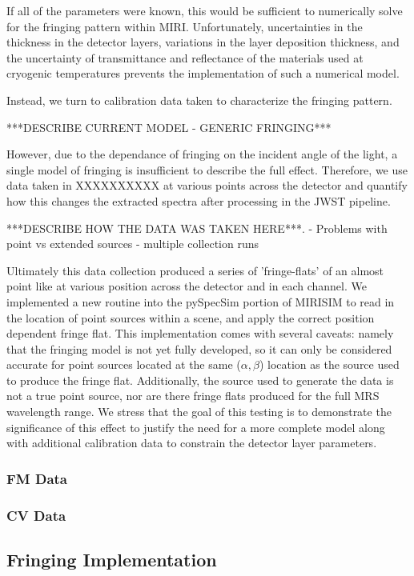 If all of the parameters were known, this would be sufficient to numerically solve for the fringing pattern within MIRI. 
Unfortunately, uncertainties in the thickness in the detector layers, variations in the layer deposition thickness, and the uncertainty of transmittance and reflectance of the materials used at cryogenic temperatures prevents the implementation of such a numerical model.

Instead, we turn to calibration data taken to characterize the fringing pattern.

 ***DESCRIBE CURRENT MODEL - GENERIC FRINGING***
 
However, due to the dependance of fringing on the incident angle of the light, a single model of fringing is insufficient to describe the full effect. 
Therefore, we use data taken in XXXXXXXXXX at various points across the detector and quantify how this changes the extracted spectra after processing in the JWST pipeline.

 ***DESCRIBE HOW THE DATA WAS TAKEN HERE***.
 - Problems with point vs extended sources
 - multiple collection runs


Ultimately this data collection produced a series of 'fringe-flats' of an almost point like at various position across the detector and in each channel.
We implemented a new routine into the pySpecSim portion of MIRISIM to read in the location of point sources within a scene, and apply the correct position dependent fringe flat. 
This implementation comes with several caveats: namely that the fringing model is not yet fully developed, so it can only be considered accurate for point sources located at the same ($\alpha,\beta$) location as the source used to produce the fringe flat. Additionally, the source used to generate the data is not a true point source, nor are there fringe flats produced for the full MRS wavelength range.
We stress that the goal of this testing is to demonstrate the significance of this effect to justify the need for a more complete model along with additional calibration data to constrain the detector layer parameters.
\subsubsection{FM Data}
\subsubsection{CV Data}
\subsection{Fringing Implementation}
